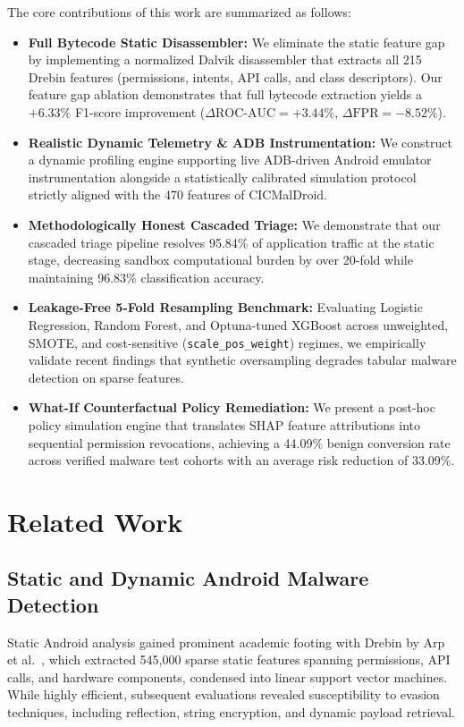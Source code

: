 \documentclass[10pt,journal,compsoc]{IEEEtran}
\begin{document}
The core contributions of this work are summarized as follows:
\begin{itemize}
    \item \textbf{Full Bytecode Static Disassembler:} We eliminate the static feature gap by implementing a normalized Dalvik disassembler that extracts all 215 Drebin features (permissions, intents, API calls, and class descriptors). Our feature gap ablation demonstrates that full bytecode extraction yields a $+6.33\%$ F1-score improvement ($\Delta \text{ROC-AUC} = +3.44\%$, $\Delta \text{FPR} = -8.52\%$).
    \item \textbf{Realistic Dynamic Telemetry & ADB Instrumentation:} We construct a dynamic profiling engine supporting live ADB-driven Android emulator instrumentation alongside a statistically calibrated simulation protocol strictly aligned with the 470 features of CICMalDroid.
    \item \textbf{Methodologically Honest Cascaded Triage:} We demonstrate that our cascaded triage pipeline resolves 95.84\% of application traffic at the static stage, decreasing sandbox computational burden by over 20-fold while maintaining 96.83\% classification accuracy.
    \item \textbf{Leakage-Free 5-Fold Resampling Benchmark:} Evaluating Logistic Regression, Random Forest, and Optuna-tuned XGBoost across unweighted, SMOTE, and cost-sensitive (\texttt{scale\_pos\_weight}) regimes, we empirically validate recent findings that synthetic oversampling degrades tabular malware detection on sparse features.
    \item \textbf{What-If Counterfactual Policy Remediation:} We present a post-hoc policy simulation engine that translates SHAP feature attributions into sequential permission revocations, achieving a 44.09\% benign conversion rate across verified malware test cohorts with an average risk reduction of 33.09\%.
\end{itemize}

\section{Related Work}
\subsection{Static and Dynamic Android Malware Detection}
Static Android analysis gained prominent academic footing with Drebin by Arp et al.~\cite{arp2014drebin}, which extracted 545,000 sparse static features spanning permissions, API calls, and hardware components, condensed into linear support vector machines. While highly efficient, subsequent evaluations revealed susceptibility to evasion techniques, including reflection, string encryption, and dynamic payload retrieval.
\end{document}

